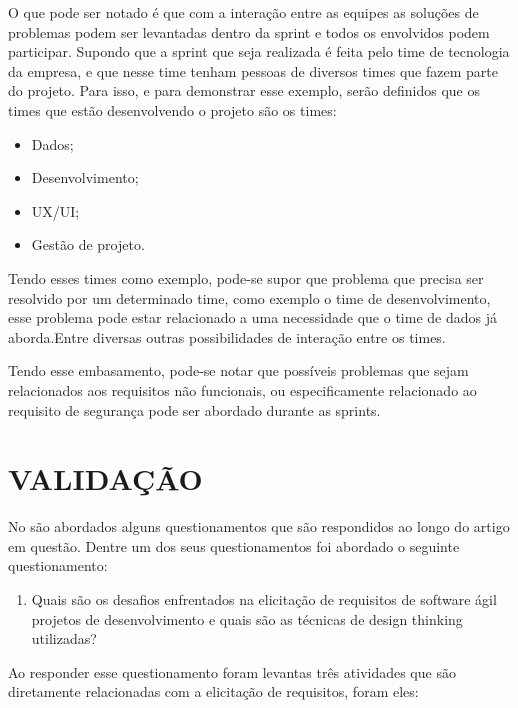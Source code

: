 \documentclass[a4paper,twoside]{article}
\begin{document}
O que pode ser notado é que com a interação entre as equipes as soluções de problemas podem ser levantadas dentro da sprint e todos os envolvidos podem participar. Supondo que a sprint que seja realizada é feita pelo time de tecnologia da empresa, e que nesse time tenham pessoas de diversos times que fazem parte do projeto. Para isso, e para demonstrar esse exemplo, serão definidos que os times que estão desenvolvendo o projeto são os times:

\begin{itemize}
    \item Dados;
    \item Desenvolvimento;
    \item UX/UI;
    \item Gestão de projeto.
\end{itemize}

Tendo esses times como exemplo, pode-se supor que  problema que precisa ser resolvido por um determinado time, como exemplo o time de desenvolvimento, esse problema pode estar relacionado a uma necessidade que o time de dados já aborda.Entre diversas outras possibilidades de interação entre os times. 

Tendo esse embasamento, pode-se notar que possíveis problemas que sejam relacionados aos requisitos não funcionais, ou especificamente relacionado ao requisito de segurança pode ser abordado durante as sprints.

\section{\uppercase{Validação}}

No \cite{DBLP:journals/information/MartinsJCKPO19} são abordados alguns questionamentos que são respondidos ao longo do artigo em questão. Dentre um dos seus questionamentos foi abordado o seguinte questionamento:
\begin{enumerate}
    \item Quais são os desafios enfrentados na elicitação de requisitos de software ágil projetos de desenvolvimento e quais são as técnicas de design thinking utilizadas?
\end{enumerate}

Ao responder esse questionamento foram levantas três atividades que são diretamente relacionadas com a elicitação de requisitos, foram eles:
\end{document}
